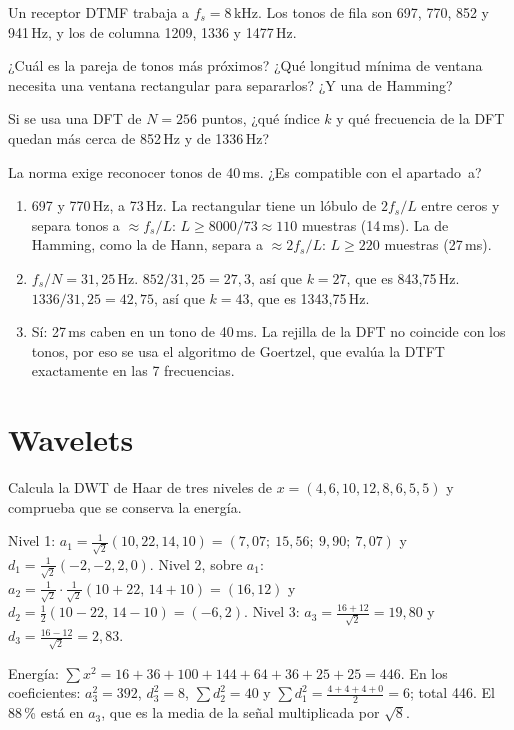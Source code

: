 \documentclass[11pt,a4paper]{scrartcl}
\begin{document}
\begin{ejercicio}
  Un receptor DTMF trabaja a $f_s=8$\,kHz. Los tonos de fila son 697, 770, 852 y 941\,Hz, y los de columna 1209, 1336 y 1477\,Hz.
  \begin{incisos}[1]
    \item ¿Cuál es la pareja de tonos más próximos? ¿Qué longitud mínima de ventana necesita una ventana rectangular para separarlos? ¿Y una de Hamming?
    \item Si se usa una DFT de $N=256$ puntos, ¿qué índice $k$ y qué frecuencia de la DFT quedan más cerca de 852\,Hz y de 1336\,Hz?
    \item La norma exige reconocer tonos de 40\,ms. ¿Es compatible con el apartado~a?
  \end{incisos}
\end{ejercicio}
\begin{solucion}
  \begin{enumerate}[label=\alph*)]
    \item 697 y 770\,Hz, a 73\,Hz. La rectangular tiene un lóbulo de $2f_s/L$ entre ceros y separa tonos a $\approx f_s/L$: $L\ge8000/73\approx110$ muestras (14\,ms). La de Hamming, como la de Hann, separa a $\approx2f_s/L$: $L\ge220$ muestras (27\,ms).
    \item $f_s/N=31{,}25$\,Hz. $852/31{,}25=27{,}3$, así que $k=27$, que es 843,75\,Hz. $1336/31{,}25=42{,}75$, así que $k=43$, que es 1343,75\,Hz.
    \item Sí: 27\,ms caben en un tono de 40\,ms. La rejilla de la DFT no coincide con los tonos, por eso se usa el algoritmo de Goertzel, que evalúa la DTFT exactamente en las 7 frecuencias.
  \end{enumerate}
\end{solucion}

\section*{Wavelets}

\begin{ejercicio}
  Calcula la DWT de Haar de tres niveles de $x=(4,6,10,12,8,6,5,5)$ y comprueba que se conserva la energía.
\end{ejercicio}
\begin{solucion}
  Nivel 1: $a_1=\frac1{\sqrt2}(10,22,14,10)=(7{,}07;\ 15{,}56;\ 9{,}90;\ 7{,}07)$ y $d_1=\frac1{\sqrt2}(-2,-2,2,0)$.
  Nivel 2, sobre $a_1$: $a_2=\frac1{\sqrt2}\cdot\frac1{\sqrt2}(10+22,\,14+10)=(16,12)$ y $d_2=\frac12(10-22,\,14-10)=(-6,2)$.
  Nivel 3: $a_3=\frac{16+12}{\sqrt2}=19{,}80$ y $d_3=\frac{16-12}{\sqrt2}=2{,}83$.

  Energía: $\sum x^2=16+36+100+144+64+36+25+25=446$. En los coeficientes: $a_3^2=392$, $d_3^2=8$, $\sum d_2^2=40$ y $\sum d_1^2=\frac{4+4+4+0}2=6$; total 446. El 88\,\% está en $a_3$, que es la media de la señal multiplicada por $\sqrt8$.
\end{solucion}
\end{document}
